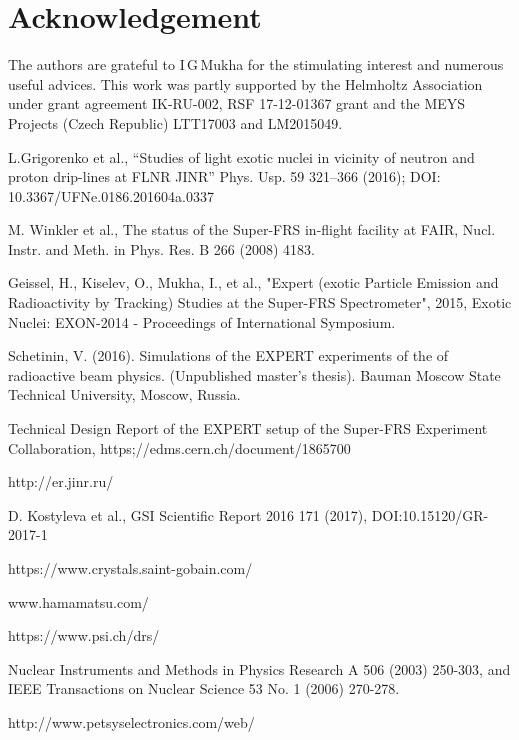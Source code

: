 \documentclass{webofc}
\begin{document}
\section{Acknowledgement}
The authors are grateful to I\,G\,Mukha for the stimulating interest and numerous useful advices.
This  work was partly supported by the Helmholtz Association under grant agreement IK-RU-002, RSF 17-12-01367 grant and the MEYS Projects (Czech Republic) LTT17003 and LM2015049.
	
\begin{thebibliography}{99}
	L.Grigorenko et al., “Studies of light exotic nuclei in vicinity of neutron and proton drip-lines at FLNR JINR” Phys. Usp. 59 321–366 (2016); DOI: 10.3367/UFNe.0186.201604a.0337
		
	M. Winkler et al., The status of the Super-FRS in-flight facility at FAIR, Nucl. Instr. and Meth. in Phys. Res. B 266 (2008) 4183.
	
	Geissel, H., Kiselev, O., Mukha, I., et al., "Expert (exotic Particle Emission and Radioactivity by Tracking) Studies at the Super-FRS Spectrometer", 2015, Exotic Nuclei: EXON-2014 - Proceedings of International Symposium.
	
	Schetinin, V. (2016). Simulations of the EXPERT experiments of the of radioactive beam physics. (Unpublished master's thesis). Bauman Moscow State Technical University, Moscow, Russia.
	
	Technical Design Report of the EXPERT setup of the Super-FRS Experiment Collaboration, https;//edms.cern.ch/document/1865700

	http://er.jinr.ru/

	D. Kostyleva et al., GSI Scientific Report 2016 171 (2017), DOI:10.15120/GR-2017-1
	
	https://www.crystals.saint-gobain.com/
	
	www.hamamatsu.com/
	
	https://www.psi.ch/drs/
	
	Nuclear Instruments and Methods in Physics Research A 506 (2003) 250-303, and
	IEEE Transactions on Nuclear Science 53 No. 1 (2006) 270-278.
	
	http://www.petsyselectronics.com/web/
	
\end{thebibliography}
\end{document}
